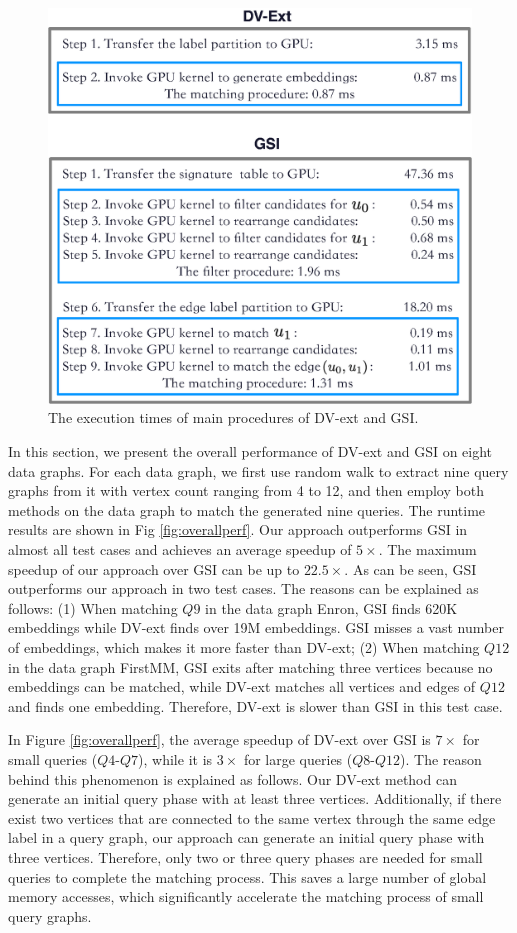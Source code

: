 \begin{figure}
\centering
\includegraphics[width=\columnwidth]{./figure/comparegsi.eps}
\caption{The execution times of main procedures of DV-ext and GSI.}	
\label{fig:compdvgsi}
\end{figure}
In this section, we present the overall performance of DV-ext and GSI on eight data graphs. For each data graph, we first use random walk to extract nine query graphs from it with vertex count ranging from 4 to 12, and then employ both methods on the data graph to match the generated nine queries. The runtime results are shown in Fig \ref{fig:overallperf}. Our approach outperforms GSI in almost all test cases and achieves an average speedup of $5\times$. The maximum speedup of our approach over GSI can be up to $22.5\times$. As can be seen, GSI outperforms our approach in two test cases. The reasons can be explained as follows: (1) When matching $Q9$ in the data graph Enron, GSI finds 620K embeddings while DV-ext finds over 19M embeddings. GSI misses a vast number of embeddings, which makes it more faster than DV-ext; (2) When matching $Q12$ in the data graph FirstMM, GSI exits after matching three vertices because no embeddings can be matched, while DV-ext matches all vertices and edges of $Q12$ and finds one embedding. Therefore, DV-ext is slower than GSI in this test case.

In Figure \ref{fig:overallperf}, the average speedup of DV-ext over GSI is $7\times$ for small queries ($Q4$-$Q7$), while it is $3\times$ for large queries ($Q8$-$Q12$). The reason behind this phenomenon is explained as follows. Our DV-ext method can generate an initial query phase with at least three vertices. Additionally, if there exist two vertices that are connected to the same vertex through the same edge label in a query graph, our approach can generate an initial query phase with three vertices. Therefore, only two or three query phases are needed for small queries to complete the matching process. This saves a large number of global memory accesses, which significantly accelerate the matching process of small query graphs.

